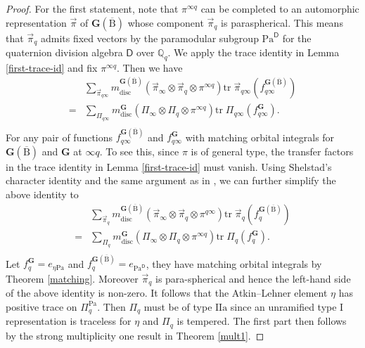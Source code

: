 \documentclass[10pt]{amsart}
\numberwithin{equation}{section}
\theoremstyle{definition}
\def\Pa{\mathrm{Pa}}
\def\bfG{\mathbf{G}}
\def\QQ{\mathbb{Q}}
\def\rma{\mathrm{a}}
\def\rmB{\mathrm{B}}
\def\rmI{\mathrm{I}}
\begin{document}
\begin{proof}
For the first statement, note that $\pi^{\infty q}$ can be completed to an automorphic representation $\vec{\pi}$ of $\bfG(\overline{\rmB})$ whose component $\vec{\pi}_{q}$ is paraspherical. This means that $\vec{\pi}_{q}$ admits fixed vectors by the paramodular subgroup $\Pa^{\mathsf{D}}$ for the quaternion division algebra $\mathsf{D}$ over $\QQ_{q}$. We apply the trace identity in Lemma \ref{first-trace-id} and fix $\pi^{\infty q}$. Then we have
\begin{equation*}
\begin{aligned}
&\sum\limits_{\vec{\pi}_{q\infty}} m^{\bfG(\overline{\rmB})}_{\mathrm{disc}}(\vec{\pi}_{\infty}\otimes\vec{\pi}_{q}\otimes\pi^{\infty q})\mathrm{tr}\phantom{.}\vec{\pi}_{q\infty}(f^{\bfG(\overline{\rmB})}_{q\infty})\\
=&\sum\limits_{\Pi_{q\infty}} m^{\bfG}_{\mathrm{disc}}(\Pi_{\infty}\otimes\Pi_{q}\otimes\pi^{\infty q})\mathrm{tr}\phantom{.}{\Pi}_{q\infty}(f^{\bfG}_{q\infty}).\\
\end{aligned}
\end{equation*}
For any pair of functions $f^{\bfG(\overline{\rmB})}_{q\infty}$ and $f^{\bfG}_{q\infty}$ with matching orbital integrals for $\bfG(\overline{\rmB})$ and $\bfG$ at  $\infty q$. To see this, since $\pi$ is of general type, the transfer factors in the trace identity in Lemma \ref{first-trace-id} must vanish. Using Shelstad's character identity \cite[Theorem 6.3]{She1} and the same argument as in \cite[4.3.2]{Sor-level-raising}, we can further simplify the above identity to 
\begin{equation*}
\begin{aligned}
&\sum\limits_{\vec{\pi}_{q}} m^{\bfG(\overline{\rmB})}_{\mathrm{disc}}(\vec{\pi}_{\infty}\otimes\vec{\pi}_{q}\otimes\pi^{q\infty})\mathrm{tr}\phantom{.}\vec{\pi}_{q}(f^{\bfG(\overline{\rmB})}_{q})\\
=&\sum\limits_{\Pi_{q}} m^{\bfG}_{\mathrm{disc}}(\Pi_{\infty}\otimes\Pi_{q}\otimes\pi^{\infty q})\mathrm{tr}\phantom{.}{\Pi}_{q}(f^{\bfG}_{q}).\\
\end{aligned}
\end{equation*}
Let $f^{\bfG}_{q}=e_{\eta\Pa}$ and $f^{\bfG(\overline{\rmB})}_{q}=e_{\Pa^{\mathsf{D}}}$, they have matching orbital integrals by Theorem \ref{matching}.  Moreover $\vec{\pi}_{q}$ is para-spherical and hence the left-hand side of the above identity is non-zero. It follows that the Atkin--Lehner element $\eta$ has positive trace on $\Pi^{\Pa}_{q}$. Then $\Pi_{q}$ must be of type $\rmI\rmI\rma$ since an unramified type $\rmI$ representation is traceless for $\eta$ and  $\Pi_{q}$  is tempered. The first part then follows by the strong multiplicity one result in Theorem \ref{mult1}.


\end{proof}
\end{document}
